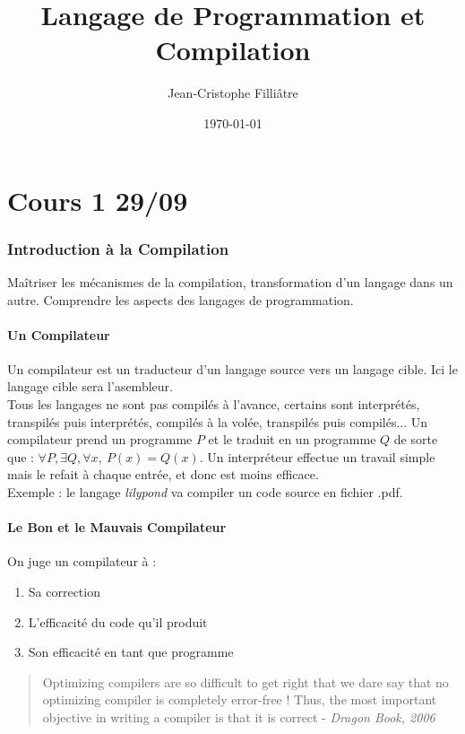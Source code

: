 \documentclass{cours}
\title{Langage de Programmation et Compilation}
\author{Jean-Cristophe Filliâtre}
\date{\today}
\begin{document}
\part[Aperçu de la Compilation - Assembleur x86-64]{Cours 1 29/09}
\localtableofcontents
\section{Introduction à la Compilation}
Maîtriser les mécanismes de la compilation, transformation d'un langage dans un autre. Comprendre les aspects des langages de programmation.\\

\subsection{Un Compilateur}
Un compilateur est un traducteur d'un langage source vers un langage cible. Ici le langage cible sera l'asembleur. \\
Tous les langages ne sont pas compilés à l'avance, certains sont interprétés, transpilés puis interprétés, compilés à la volée, transpilés puis compilés...
Un compilateur prend un programme $P$ et le traduit en un programme $Q$ de sorte que : $\forall P, \exists Q, \forall x, \ P(x) = Q(x)$. Un interpréteur effectue un travail simple mais le refait à chaque entrée, et donc est moins efficace.\\
Exemple : le langage \textsl{lilypond} va compiler un code source en fichier .pdf. \\

\subsection{Le Bon et le Mauvais Compilateur}
On juge un compilateur à : \begin{enumerate}
    \item Sa correction
    \item L'efficacité du code qu'il produit
    \item Son efficacité en tant que programme
\end{enumerate}
\begin{quote}
    \og Optimizing compilers are so difficult to get right that we dare say that no optimizing compiler is completely error-free ! Thus, the most important objective in writing a compiler is that it is correct \fg - \textit{Dragon Book, 2006}
\end{quote}
\end{document}

